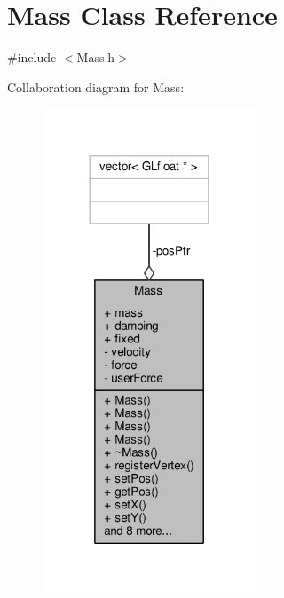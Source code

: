 \hypertarget{classMass}{}\section{Mass Class Reference}
\label{classMass}


{\ttfamily \#include $<$Mass.\+h$>$}



Collaboration diagram for Mass\+:\nopagebreak
\begin{figure}[H]
\begin{center}
\leavevmode
\includegraphics[width=180pt]{classMass__coll__graph}
\end{center}
\end{figure}
